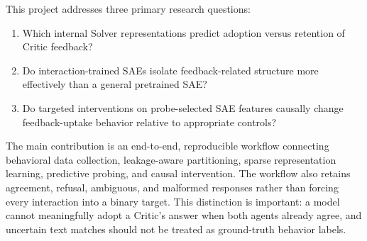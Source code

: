 This project addresses three primary research questions:

\begin{enumerate}
    \item Which internal Solver representations predict adoption versus
    retention of Critic feedback?
    \item Do interaction-trained SAEs isolate feedback-related structure more
    effectively than a general pretrained SAE?
    \item Do targeted interventions on probe-selected SAE features causally
    change feedback-uptake behavior relative to appropriate controls?
\end{enumerate}

The main contribution is an end-to-end, reproducible workflow connecting
behavioral data collection, leakage-aware partitioning, sparse representation
learning, predictive probing, and causal intervention. The workflow also
retains agreement, refusal, ambiguous, and malformed responses rather than
forcing every interaction into a binary target. This distinction is important:
a model cannot meaningfully adopt a Critic's answer when both agents already
agree, and uncertain text matches should not be treated as ground-truth
behavior labels.
